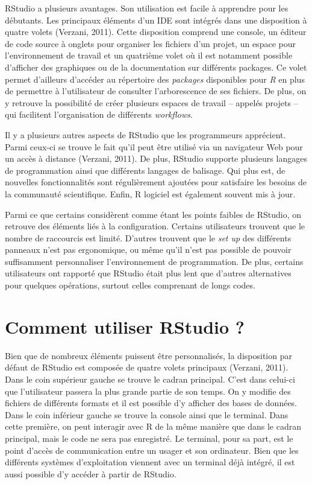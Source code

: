 \documentclass[
  letterpaper,
]{scrbook}
\begin{document}
RStudio a plusieurs avantages. Son utilisation est facile à apprendre
pour les débutants. Les principaux éléments d'un IDE sont intégrés dans
une disposition à quatre volets (Verzani, 2011). Cette disposition
comprend une console, un éditeur de code source à onglets pour organiser
les fichiers d'un projet, un espace pour l'environnement de travail et
un quatrième volet où il est notamment possible d'afficher des
graphiques ou de la documentation sur différents packages. Ce volet
permet d'ailleurs d'accéder au répertoire des \emph{packages}
disponibles pour \emph{R} en plus de permettre à l'utilisateur de
consulter l'arborescence de ses fichiers. De plus, on y retrouve la
possibilité de créer plusieurs espaces de travail -- appelés projets --
qui facilitent l'organisation de différents \emph{workflows}.

Il y a plusieurs autres aspects de RStudio que les programmeurs
apprécient. Parmi ceux-ci se trouve le fait qu'il peut être utilisé via
un navigateur Web pour un accès à distance (Verzani, 2011). De plus,
RStudio supporte plusieurs langages de programmation ainsi que
différents langages de balisage. Qui plus est, de nouvelles
fonctionnalités sont régulièrement ajoutées pour satisfaire les besoins
de la communauté scientifique. Enfin, R logiciel est également souvent
mis à jour.

Parmi ce que certains considèrent comme étant les points faibles de
RStudio, on retrouve des éléments liés à la configuration. Certains
utilisateurs trouvent que le nombre de raccourcis est limité. D'autres
trouvent que le \emph{set up} des différents panneaux n'est pas
ergonomique, ou même qu'il n'est pas possible de pouvoir suffisamment
personnaliser l'environnement de programmation. De plus, certains
utilisateurs ont rapporté que RStudio était plus lent que d'autres
alternatives pour quelques opérations, surtout celles comprenant de
longs codes.

\hypertarget{comment-utiliser-rstudio}{%
\section{Comment utiliser RStudio ?}\label{comment-utiliser-rstudio}}

Bien que de nombreux éléments puissent être personnalisés, la
disposition par défaut de RStudio est composée de quatre volets
principaux (Verzani, 2011). Dans le coin supérieur gauche se trouve le
cadran principal. C'est dans celui-ci que l'utilisateur passera la plus
grande partie de son temps. On y modifie des fichiers de différents
formats et il est possible d'y afficher des bases de données. Dans le
coin inférieur gauche se trouve la console ainsi que le terminal. Dans
cette première, on peut interagir avec R de la même manière que dans le
cadran principal, mais le code ne sera pas enregistré. Le terminal, pour
sa part, est le point d'accès de communication entre un usager et son
ordinateur. Bien que les différents systèmes d'exploitation viennent
avec un terminal déjà intégré, il est aussi possible d'y accéder à
partir de RStudio.
\end{document}
